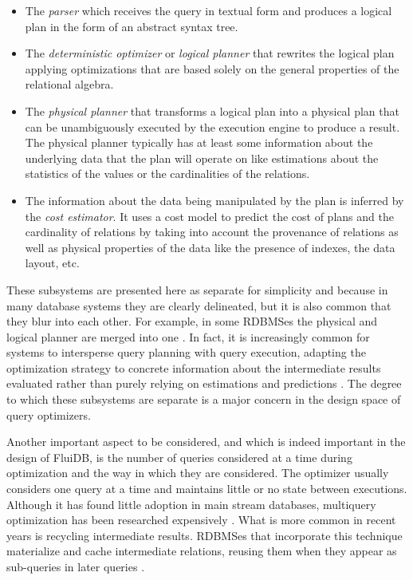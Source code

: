 \begin{itemize}

\item The \emph{parser} which receives the query in textual form and
  produces a logical plan in the form of an abstract syntax tree.
\item The \emph{deterministic optimizer} or \emph{logical planner}
  that rewrites the logical plan applying optimizations that are based
  solely on the general properties of the relational algebra.
\item The \emph{physical planner} that transforms a logical plan into
  a physical plan that can be unambiguously executed by the execution
  engine to produce a result. The physical planner typically has at
  least some information about the underlying data that the plan will
  operate on like estimations about the statistics of the values or
  the cardinalities of the relations.
\item The information about the data being manipulated by the plan is
  inferred by the \emph{cost estimator}. It uses a cost model to
  predict the cost of plans and the cardinality of relations by taking
  into account the provenance of relations as well as physical
  properties of the data like the presence of indexes, the data layout,
  etc.
\end{itemize}

These subsystems are presented here as separate for simplicity and
because in many database systems they are clearly delineated, but it is
also common that they blur into each other. For example, in some RDBMSes
the physical and logical planner are merged into one
\cite{graefeCascadesFrameworkQuery1995,shankarQueryOptimizationMicrosoft2012,solimanOrcaModularQuery2014}. In
fact, it is increasingly common for systems to intersperse query
planning with query execution, adapting the optimization strategy
\cite{graefeDynamicQueryEvaluation1989} to concrete information about
the intermediate results evaluated rather than purely relying on
estimations and predictions
\cite{dingPlanStitchHarnessing2018,chaudhuriPayasyougoFrameworkQuery2008,wuSamplingbasedQueryReoptimization2016,herodotouXplusSqltuningawareQuery2010}. The
degree to which these subsystems are separate is a major concern in
the design space of query optimizers.

Another important aspect to be considered, and which is indeed
important in the design of FluiDB, is the number of queries considered
at a time during optimization and the way in which they are
considered. The optimizer usually considers one query at a time and
maintains little or no state between executions. Although it has found
little adoption in main stream databases, multiquery optimization has
been researched expensively
\cite{michiardiCachebasedMultiqueryOptimization2021,wangMultiqueryOptimizationMapreduce2013,royEfficientExtensibleAlgorithms2000,rogersMultiqueryOptimization2017}. What
is more common in recent years is recycling intermediate
results. RDBMSes that incorporate this technique materialize and cache
intermediate relations, reusing them when they appear as sub-queries
in later queries
\cite{perezHistoryawareQueryOptimization2014,nagelRecyclingPipelinedQuery2013,ivanovaArchitectureRecyclingIntermediates2010}.

